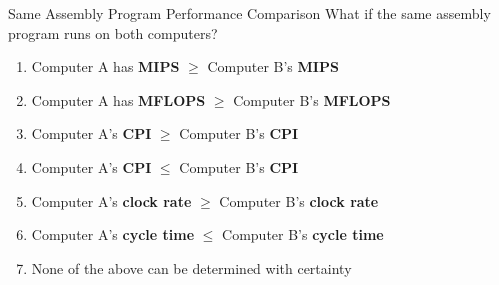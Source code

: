 \documentclass[aspectratio=169,12pt]{beamer}
\begin{document}
\begin{frame}{Same Assembly Program Performance Comparison}
What if the same assembly program runs on both computers?

\begin{enumerate}
    \item Computer A has \textbf{MIPS} $\geq$ Computer B's \textbf{MIPS}
    \item Computer A has \textbf{MFLOPS} $\geq$ Computer B's \textbf{MFLOPS}
    \item Computer A's \textbf{CPI} $\geq$ Computer B's \textbf{CPI}
    \item Computer A's \textbf{CPI} $\leq$ Computer B's \textbf{CPI}
    \item Computer A's \textbf{clock rate} $\geq$ Computer B's \textbf{clock rate}
    \item Computer A's \textbf{cycle time} $\leq$ Computer B's \textbf{cycle time}
    \item None of the above can be determined with certainty
\end{enumerate}\end{frame}
\end{document}
